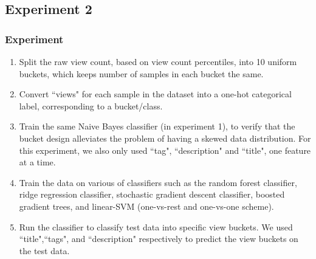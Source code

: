 \documentclass[english]{article}
\begin{document}
\subsection{Experiment 2}
\subsubsection{Experiment}
\begin{enumerate}
\item Split the raw view count, based on view count percentiles, into 10 uniform buckets, which keeps number of samples in each bucket the same. 
\item Convert ``views" for each sample in the dataset into a one-hot categorical label, corresponding to a bucket/class.
\item Train the same Naive Bayes classifier (in experiment 1), to verify that the bucket design alleviates the problem of having a skewed data distribution. For this experiment, we also only used ``tag", ``description" and ``title", one feature at a time.
\item Train the data on various of classifiers such as the random forest classifier, ridge regression classifier, stochastic gradient descent classifier, boosted gradient trees, and linear-SVM (one-vs-rest and one-vs-one scheme).
\item Run the classifier to classify test data into specific view buckets. We used ``title",``tags", and ``description" respectively to predict the view buckets on the test data.
\end{enumerate}
\end{document}
